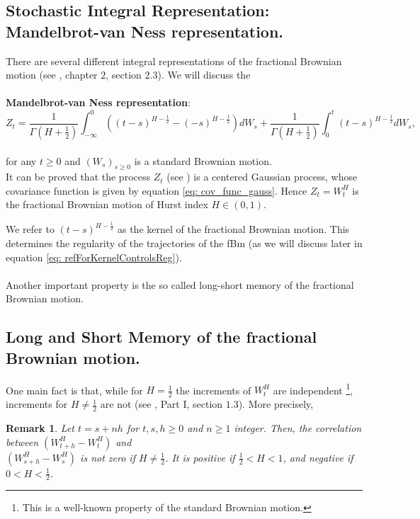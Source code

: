 \documentclass[a4paper,italian,11pt]{book}
\newtheorem{remark}{Remark}
\theoremstyle{plain}
\theoremstyle{remark}
\theoremstyle{plain}
\begin{document}
\subsection{Stochastic Integral Representation: Mandelbrot-van Ness representation.}
\label{subsection: mandelbrotvanness}

There are several different integral representations of the fractional Brownian motion (see \cite{NourdinIvan}, chapter $2$, section $2.3$). We will discuss the
\\
\\
\textbf{Mandelbrot-van Ness representation}:
\begin{equation}
    \label{eq: mandelbroFBM}
    Z_t = \frac{1}{\Gamma(H+\frac{1}{2})} \int_{-\infty}^0((t-s)^{H-\frac{1}{2}} - (-s)^{H-\frac{1}{2}})dW_s + \frac{1}{\Gamma(H+\frac{1}{2})} \int_0^t(t-s)^{H-\frac{1}{2}}dW_s,
\end{equation}
\\
\noindent
for any $t\ge0$ and $(W_s)_{s\ge 0}$ is a standard Brownian motion. \\
It can be proved that the process $Z_t$ (see \cite{156!}) is a centered Gaussian process, whose covariance function is given by equation \eqref{eq: cov_func_gauss}. Hence $Z_t=W_t^H$ is the fractional Brownian motion of Hurst index $H\in (0,1)$.

We refer to $(t-s)^{H-\frac{1}{2}}$ as the kernel of the fractional Brownian motion. This determines the regularity of the trajectories of the fBm (as we will discuss later in equation \eqref{eq: refForKernelControlsReg}). 
\\
\\
Another important property is the so called long-short memory of the fractional Brownian motion.

\subsection{Long and Short Memory of the fractional Brownian motion.}

One main fact is that, while for $H=\frac{1}{2}$ the increments of $W^H_t$ are independent \footnote{This is a well-known property of the standard Brownian motion.}, increments for $H\ne \frac{1}{2}$ are not (see \cite{ZhangBook}, Part I, section $1.3$).
More precisely, 

\begin{remark}
Let $t=s+nh$ for $t,s,h\ge 0$ and $n\ge 1$ integer. 
Then, the correlation between $\left( W^H_{t+h}-W^H_t\right)$ and \\
$\left( W^H_{s+h}-W^H_s\right)$ is not zero if $H\ne \frac{1}{2}$. It is positive if $\frac{1}{2}<H<1$, and negative if $0<H<\frac{1}{2}$.
\end{remark}
\end{document}
